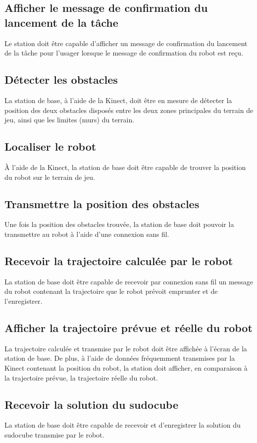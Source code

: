 \subsection{Afficher le message de confirmation du lancement de la tâche}
Le station doit être capable d'afficher un message de confirmation du lancement de la tâche pour l'usager lorsque le message de confirmation du robot est reçu.
\subsection{Détecter les obstacles}
La station de base, à l'aide de la Kinect, doit être en mesure de détecter la position des deux obstacles disposés entre les deux zones principales du terrain de jeu, ainsi que les limites (murs) du terrain.
\subsection{Localiser le robot}
À l'aide de la Kinect, la station de base doit être capable de trouver la position du robot sur le terrain de jeu.
\subsection{Transmettre la position des obstacles}
Une fois la position des obstacles trouvée, la station de base doit pouvoir la transmettre au robot à l'aide d'une connexion sans fil.
\subsection{Recevoir la trajectoire calculée par le robot}
La station de base doit être capable de recevoir par connexion sans fil un message du robot contenant la trajectoire que le robot prévoit emprunter et de l'enregistrer.
\subsection{Afficher la trajectoire prévue et réelle du robot}
La trajectoire calculée et transmise par le robot doit être affichée à l'écran de la station de base. De plus, à l'aide de données fréquemment transmises par la Kinect contenant la position du robot, la station doit afficher, en comparaison à la trajectoire prévue, la trajectoire réelle du robot.
\subsection{Recevoir la solution du sudocube}
La station de base doit être capable de recevoir et d'enregistrer la solution du sudocube transmise par le robot.
